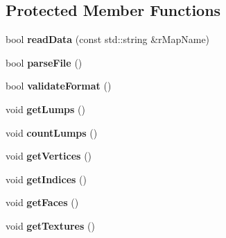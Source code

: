 \subsection*{Protected Member Functions}
\begin{DoxyCompactItemize}
\item 
\hypertarget{class_assimp_1_1_q3_b_s_p_file_parser_abb6d10ee273ebe265c96ff8dddf6d1ac}{bool {\bfseries read\+Data} (const std\+::string \&r\+Map\+Name)}\label{class_assimp_1_1_q3_b_s_p_file_parser_abb6d10ee273ebe265c96ff8dddf6d1ac}

\item 
\hypertarget{class_assimp_1_1_q3_b_s_p_file_parser_ab4676e0ebb90b387d45c4695200546ec}{bool {\bfseries parse\+File} ()}\label{class_assimp_1_1_q3_b_s_p_file_parser_ab4676e0ebb90b387d45c4695200546ec}

\item 
\hypertarget{class_assimp_1_1_q3_b_s_p_file_parser_ae2f3869e36a1aa8c949af7bd6ad72f09}{bool {\bfseries validate\+Format} ()}\label{class_assimp_1_1_q3_b_s_p_file_parser_ae2f3869e36a1aa8c949af7bd6ad72f09}

\item 
\hypertarget{class_assimp_1_1_q3_b_s_p_file_parser_a9dd8b5ad0e57ba3e1ab78f9c5bcb20f9}{void {\bfseries get\+Lumps} ()}\label{class_assimp_1_1_q3_b_s_p_file_parser_a9dd8b5ad0e57ba3e1ab78f9c5bcb20f9}

\item 
\hypertarget{class_assimp_1_1_q3_b_s_p_file_parser_a396583fad2c8a8bec45e439d1e0d73b8}{void {\bfseries count\+Lumps} ()}\label{class_assimp_1_1_q3_b_s_p_file_parser_a396583fad2c8a8bec45e439d1e0d73b8}

\item 
\hypertarget{class_assimp_1_1_q3_b_s_p_file_parser_ad4272e238bde770a4a0508bbd4596124}{void {\bfseries get\+Vertices} ()}\label{class_assimp_1_1_q3_b_s_p_file_parser_ad4272e238bde770a4a0508bbd4596124}

\item 
\hypertarget{class_assimp_1_1_q3_b_s_p_file_parser_a333d50d4dfb06380d8c5d4c09c344797}{void {\bfseries get\+Indices} ()}\label{class_assimp_1_1_q3_b_s_p_file_parser_a333d50d4dfb06380d8c5d4c09c344797}

\item 
\hypertarget{class_assimp_1_1_q3_b_s_p_file_parser_ab3ef601c7c0806987d90b0fa8726586a}{void {\bfseries get\+Faces} ()}\label{class_assimp_1_1_q3_b_s_p_file_parser_ab3ef601c7c0806987d90b0fa8726586a}

\item 
\hypertarget{class_assimp_1_1_q3_b_s_p_file_parser_a57787b09a90736242d5631def9a74dc4}{void {\bfseries get\+Textures} ()}\label{class_assimp_1_1_q3_b_s_p_file_parser_a57787b09a90736242d5631def9a74dc4}


\end{DoxyCompactItemize}
